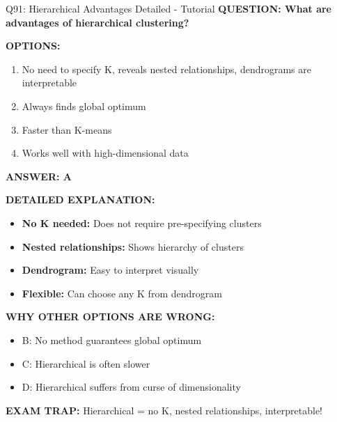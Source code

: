 \documentclass[8pt]{beamer}
\begin{document}
	\begin{frame}{Q91: Hierarchical Advantages Detailed - Tutorial}
		\fontsize{6.5}{7.5}\selectfont
		\textbf{QUESTION: What are advantages of hierarchical clustering?}
		
		\vspace{0.1cm}
		\textbf{OPTIONS:}
		\begin{enumerate}
			\item No need to specify K, reveals nested relationships, dendrograms are interpretable
			\item Always finds global optimum
			\item Faster than K-means
			\item Works well with high-dimensional data
		\end{enumerate}
		
		\vspace{0.1cm}
		\textcolor{myblue}{\textbf{ANSWER: A}}
		
		\vspace{0.1cm}
		\textbf{DETAILED EXPLANATION:}
		\begin{itemize}
			\item \textbf{No K needed:} Does not require pre-specifying clusters
			\item \textbf{Nested relationships:} Shows hierarchy of clusters
			\item \textbf{Dendrogram:} Easy to interpret visually
			\item \textbf{Flexible:} Can choose any K from dendrogram
		\end{itemize}
		
		\vspace{0.1cm}
		\textcolor{myred}{\textbf{WHY OTHER OPTIONS ARE WRONG:}}
		\begin{itemize}
			\item \textcolor{myred}{B:} No method guarantees global optimum
			\item \textcolor{myred}{C:} Hierarchical is often slower
			\item \textcolor{myred}{D:} Hierarchical suffers from curse of dimensionality
		\end{itemize}
		
		\textcolor{myred}{\textbf{EXAM TRAP:}} Hierarchical = \textcolor{myblue}{no K, nested relationships, interpretable}!
	\end{frame}
	
\end{document}
